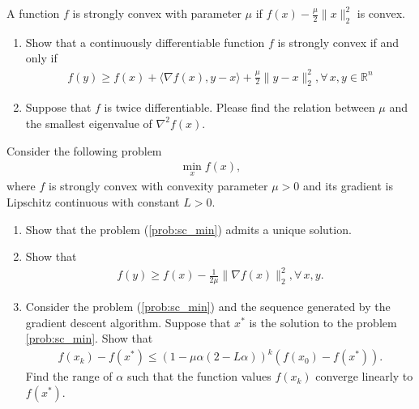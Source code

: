 \documentclass[11pt,letter,notitlepage]{article}
\begin{document}
\begin{exercise}
A function $f$ is strongly convex with parameter $\mu$ if $f(x)-\frac{\mu}{2}\|x\|_2^2$ is convex.
\begin{enumerate}
    \item Show that a continuously differentiable function $f$ is strongly convex if and only if 
    \begin{align*}
        f(y)\ge f(x)+\langle\nabla f(x),y-x\rangle+\frac{\mu}{2}\|y-x\|_2^2, \forall\, x,y\in\mathbb{R}^n
    \end{align*}
    \item Suppose that $f$ is twice differentiable. Please find the relation between $\mu$ and the smallest eigenvalue of $\nabla^2f(x)$.
\end{enumerate}

\noindent Consider the following problem 
\begin{align}\label{prob:sc_min}
    \min_{x}f(x),
\end{align}
where $f$ is strongly convex with convexity parameter $\mu>0$ and its gradient is Lipschitz continuous with constant $L>0$.
\begin{enumerate}[resume]
    \item Show that the problem (\ref{prob:sc_min}) admits a unique solution.
    \item Show that
    \begin{align*}
        f(y)\ge f(x)-\frac{1}{2\mu}\|\nabla f(x)\|_2^2, \forall\, x,y.
    \end{align*}
    \item Consider the problem (\ref{prob:sc_min}) and the sequence generated by the gradient descent algorithm. Suppose that $x^*$ is the solution to the problem \ref{prob:sc_min}. Show that
    \begin{align*}
        f(x_k)-f(x^*)\le (1-\mu\alpha(2-L\alpha))^k(f(x_0)-f(x^*)).
    \end{align*}
    Find the range of $\alpha$ such that the function values $f(x_k)$ converge linearly to  $f(x^*)$.
\end{enumerate}
\end{exercise}
\end{document}
